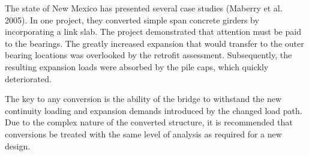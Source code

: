 The state of New Mexico has presented several case studies (Maberry et al. 2005). In one project, they converted simple span concrete girders by incorporating a link slab. The project demonstrated that attention must be paid to the bearings. The greatly increased expansion that would transfer to the outer bearing locations was overlooked by the retrofit assessment. Subsequently, the resulting expansion loads were absorbed by the pile caps, which quickly deteriorated.

The key to any conversion is the ability of the bridge to withstand the new continuity loading and expansion demands introduced by the changed load path. Due to the complex nature of the converted structure, it is recommended that conversions be treated with the same level of analysis as required for a new design.